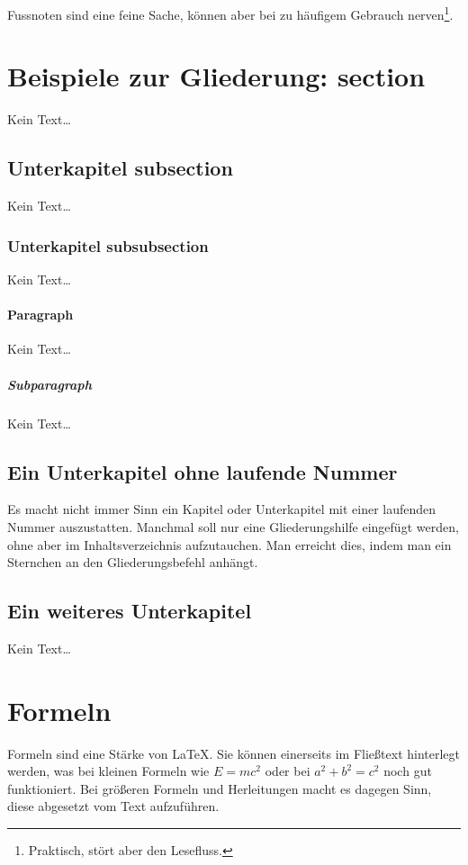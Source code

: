 Fussnoten sind eine feine Sache, können aber bei zu häufigem Gebrauch
nerven\footnote{Praktisch, stört aber den Lesefluss.}.



\section{Beispiele zur Gliederung: section}
Kein Text\ldots



\subsection{Unterkapitel subsection}
Kein Text\ldots



\subsubsection{Unterkapitel subsubsection}
Kein Text\ldots

\paragraph{Paragraph}
Kein Text\ldots

\subparagraph{Subparagraph}
Kein Text\ldots



\subsection*{Ein Unterkapitel ohne laufende Nummer}
Es macht nicht immer Sinn ein Kapitel oder Unterkapitel mit einer laufenden
Nummer auszustatten. Manchmal soll nur eine Gliederungshilfe
eingefügt werden, ohne aber im Inhaltsverzeichnis aufzutauchen.
Man erreicht dies, indem man ein Sternchen an den Gliederungsbefehl
anhängt.



\subsection{Ein weiteres Unterkapitel}
Kein Text\ldots



\section{Formeln}
\label{text:formeln}
Formeln sind eine Stärke von \LaTeX . Sie können einerseits im Fließtext hinterlegt
werden, was bei kleinen Formeln
wie $ E=mc^2 $ oder bei \(a^2+b^2=c^2\) noch %
gut funktioniert. Bei größeren Formeln und Herleitungen macht es
dagegen Sinn, diese abgesetzt vom Text aufzuführen.

